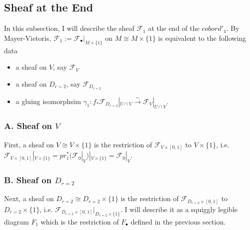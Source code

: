 \subsection*{Sheaf at the End}
In this subsection, I will describe the sheaf $\mathscr{F}_1$ at the end of the $cobord'_4$. By Mayer-Vietoris, $\mathscr{F}_1:= \mathscr{F}_\bullet|_{M\times\{1\}}$ on $M \cong M\times\{1\}$ is equivalent to the following data
\begin{itemize}
\item a sheaf on $V$, say $\mathscr{F}_{V}$

\item a sheaf on $D_{r=2}$, say $\mathscr{F}_{D_{r=2}}$

\item a gluing isomorphsim $\gamma_1 : f_*\mathscr{F}_{D_{r=2}}|_{U\cap V} \xrightarrow{\sim} \mathscr{F}_{V}|_{U\cap V}$.
\end{itemize}

\subsubsection{A. Sheaf on $V$}
First, a sheaf on $V\cong V\times\{1\}$ is the restriction of $\mathscr{F}_{V\times [0,1]}$ to $V\times \{1\}$, i.e. $\mathscr{F}_{V\times [0,1]}|_{V\times \{1\}}= pr_1^*(\mathscr{F}_0|_V)|_{V\times \{1\}} = \mathscr{F}_0|_V$.
\subsubsection{B. Sheaf on $D_{r=2}$}
Next, a sheaf on $D_{r=2}\cong D_{r=2}\times \{1\}$ is the restriction of $\mathscr{F}_{D_{r=2}\times [0,1]}$ to $D_{r=2}\times \{1\}$, i.e. $\mathscr{F}_{D_{r=2}\times [0,1]} |_{D_{r=2}\times \{1\}}$. I will describe it as a squiggly legible diagram $F_1$ which is the restriction of $F_\bullet$ defined in the previous section.

